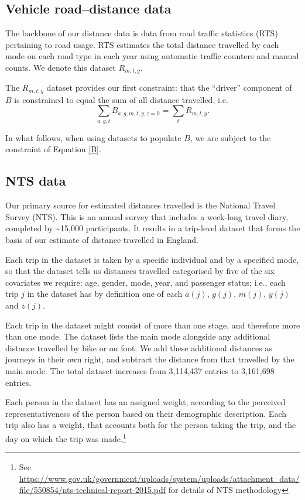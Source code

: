 \documentclass{article}
\begin{document}
\subsection{Vehicle road--distance data}\label{rts}

The backbone of our distance data is data from road traffic statistics (RTS) pertaining to road usage. RTS estimates the total distance travelled by each mode on each road type in each year using automatic traffic counters and manual counts. We denote this dataset $R_{m,t,y}$. 

The $R_{m,t,y}$ dataset provides our first constraint: that the ``driver'' component of $B$ is constrained to equal the sum of all distance travelled, i.e. \begin{equation}\label{B}\sum_{a,g,t}B_{a,g,m,t,y,z=0} = \sum_{t}R_{m,t,y}.\end{equation}
 
In what follows, when using datasets to populate $B$, we are subject to the constraint of Equation \ref{B}. 

\subsection{NTS data}\label{nts}

Our primary source for estimated distances travelled is the National Travel Survey (NTS). This is an annual survey that includes a week-long travel diary, completed by \textasciitilde 15,000 participants. It results in a trip-level dataset that forms the basis of our estimate of distance travelled in England.

Each trip in the dataset is taken by a specific individual and by a specified mode, so that the dataset tells us distances travelled categorised by five of the six covariates we require: age, gender, mode, year, and passenger status; i.e., each trip $j$ in the dataset has by definition one of each $a(j)$, $g(j)$, $m(j)$, $y(j)$ and $z(j)$. 

Each trip in the dataset might consist of more than one stage, and therefore more than one mode. The dataset lists the main mode alongside any additional distance travelled by bike or on foot. We add these additional distances as journeys in their own right, and subtract the distance from that travelled by the main mode. The total dataset increases from 3,114,437 entries to 3,161,698 entries.

Each person in the dataset has an assigned weight, according to the perceived representativeness of the person based on their demographic description. Each trip also has a weight, that accounts both for the person taking the trip, and the day on which the trip was made.\footnote{See \url{https://www.gov.uk/government/uploads/system/uploads/attachment_data/file/550854/nts-technical-report-2015.pdf} for details of NTS methodology}
\end{document}
